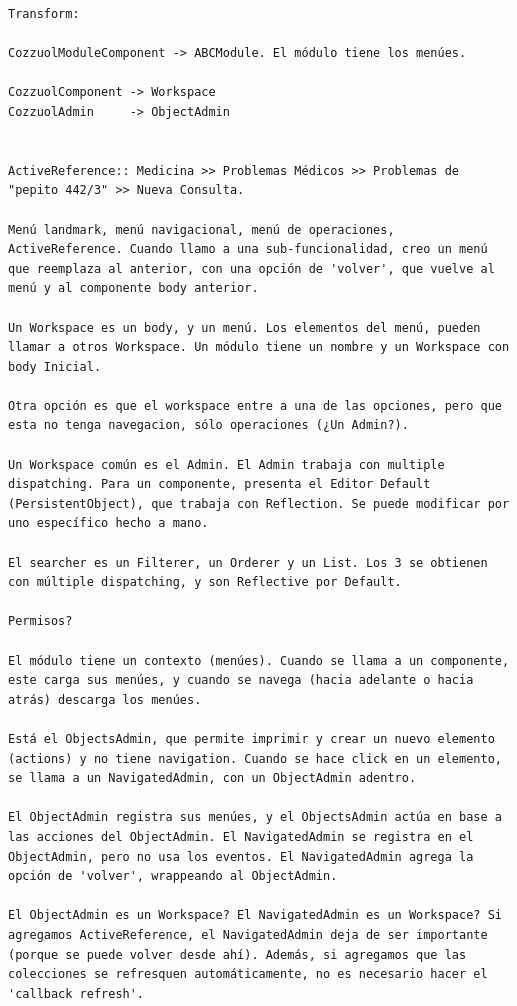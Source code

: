 \documentclass[a4paper,10pt]{article}
\begin{document}
\begin{verbatim}
Transform:

CozzuolModuleComponent -> ABCModule. El módulo tiene los menúes.

CozzuolComponent -> Workspace
CozzuolAdmin     -> ObjectAdmin


ActiveReference:: Medicina >> Problemas Médicos >> Problemas de "pepito 442/3" >> Nueva Consulta.

Menú landmark, menú navigacional, menú de operaciones, ActiveReference. Cuando llamo a una sub-funcionalidad, creo un menú que reemplaza al anterior, con una opción de 'volver', que vuelve al menú y al componente body anterior.

Un Workspace es un body, y un menú. Los elementos del menú, pueden llamar a otros Workspace. Un módulo tiene un nombre y un Workspace con body Inicial.

Otra opción es que el workspace entre a una de las opciones, pero que esta no tenga navegacion, sólo operaciones (¿Un Admin?).

Un Workspace común es el Admin. El Admin trabaja con multiple dispatching. Para un componente, presenta el Editor Default (PersistentObject), que trabaja con Reflection. Se puede modificar por uno específico hecho a mano.

El searcher es un Filterer, un Orderer y un List. Los 3 se obtienen con múltiple dispatching, y son Reflective por Default.

Permisos?

El módulo tiene un contexto (menúes). Cuando se llama a un componente, este carga sus menúes, y cuando se navega (hacia adelante o hacia atrás) descarga los menúes.

Está el ObjectsAdmin, que permite imprimir y crear un nuevo elemento (actions) y no tiene navigation. Cuando se hace click en un elemento, se llama a un NavigatedAdmin, con un ObjectAdmin adentro.

El ObjectAdmin registra sus menúes, y el ObjectsAdmin actúa en base a las acciones del ObjectAdmin. El NavigatedAdmin se registra en el ObjectAdmin, pero no usa los eventos. El NavigatedAdmin agrega la opción de 'volver', wrappeando al ObjectAdmin.

El ObjectAdmin es un Workspace? El NavigatedAdmin es un Workspace? Si agregamos ActiveReference, el NavigatedAdmin deja de ser importante (porque se puede volver desde ahí). Además, si agregamos que las colecciones se refresquen automáticamente, no es necesario hacer el 'callback refresh'.
\end{verbatim}
\end{document}

